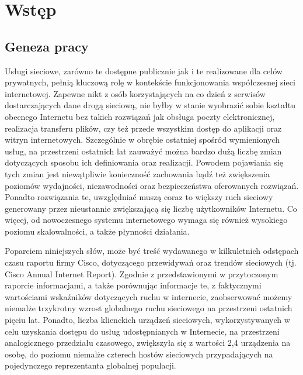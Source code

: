 \chapter{Wstęp}
\section{Geneza pracy}
Usługi sieciowe, zarówno te dostępne publicznie jak i te realizowane dla celów prywatnych, pełnią kluczową rolę w kontekście funkcjonowania współczesnej sieci internetowej. Zapewne nikt z osób korzystających na co dzień z serwisów dostarczających dane drogą sieciową, nie byłby w stanie wyobrazić sobie kształtu obecnego Internetu bez takich rozwiązań jak obsługa poczty elektronicznej, realizacja transferu plików, czy też przede wszystkim dostęp do aplikacji oraz witryn internetowych. Szczególnie w obrębie ostatniej spośród wymienionych usług, na przestrzeni ostatnich lat zauważyć można bardzo dużą liczbę zmian dotyczących sposobu ich definiowania oraz realizacji. Powodem pojawiania się tych zmian jest niewątpliwie konieczność zachowania bądź też zwiększenia poziomów wydajności, niezawodności oraz bezpieczeństwa oferowanych rozwiązań. Ponadto rozwiązania te, uwzględniać muszą coraz to większy ruch sieciowy generowany przez nieustannie zwiększającą się liczbę użytkowników Internetu. Co więcej, od nowoczesnego systemu internetowego wymaga się również wysokiego poziomu skalowalności, a także płynności działania.

Poparciem niniejszych słów, może być treść wydawanego w kilkuletnich odstępach czasu raportu firmy Cisco, dotyczącego przewidywań oraz trendów sieciowych (tj. Cisco Annual Internet Report). Zgodnie z przedstawionymi w przytoczonym raporcie informacjami, a także porównując informacje te, z faktycznymi wartościami wskaźników dotyczących ruchu w internecie, zaobserwować możemy niemalże trzykrotny wzrost globalnego ruchu sieciowego na przestrzeni ostatnich pięciu lat. Ponadto, liczba klienckich urządzeń sieciowych, wykorzystywanych w celu uzyskania dostępu do usług udostępnianych w Internecie, na przestrzeni analogicznego przedziału czasowego, zwiększyła się z wartości 2,4 urządzenia na osobę, do poziomu niemalże czterech hostów sieciowych przypadających na pojedynczego reprezentanta globalnej populacji.

